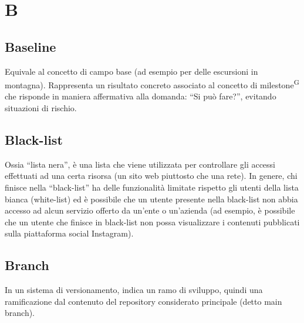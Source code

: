 \section{B}


\subsection{Baseline} 
Equivale al concetto di campo base (ad esempio per delle escursioni in montagna). Rappresenta un risultato concreto associato al concetto di milestone\textsuperscript{G} che risponde in maniera affermativa alla domanda: “Si può fare?”, evitando situazioni di rischio.


\subsection{Black-list} Ossia “lista nera”, è una lista che viene utilizzata per controllare gli accessi effettuati ad una certa risorsa (un sito web piuttosto che una rete). In genere, chi finisce nella “black-list” ha delle funzionalità limitate rispetto gli utenti della lista bianca (white-list) ed è possibile che un utente presente nella black-list non abbia accesso ad alcun servizio offerto da un’ente o un’azienda (ad esempio, è possibile che un utente che finisce in black-list non possa visualizzare i contenuti pubblicati sulla piattaforma social Instagram). 



\subsection{Branch}
In un sistema di versionamento, indica un ramo di sviluppo, quindi una ramificazione dal contenuto del repository considerato principale (detto main branch). 


\clearpage